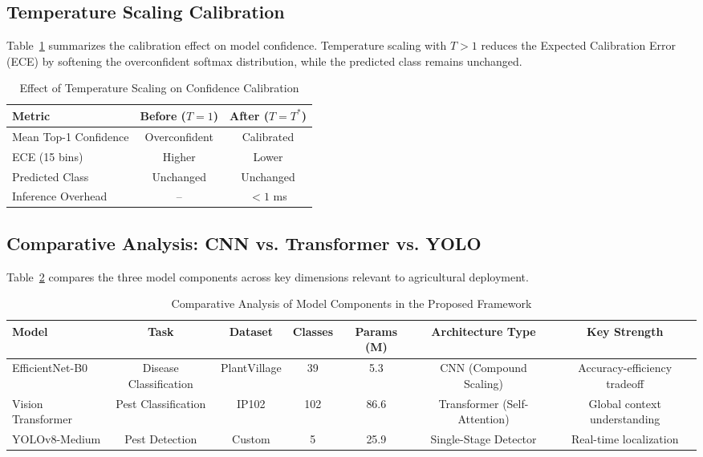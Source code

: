 \documentclass[conference]{IEEEtran}
\begin{document}
\subsection{Temperature Scaling Calibration}

Table~\ref{tab:calibration} summarizes the calibration effect on model confidence. Temperature scaling with $T > 1$ reduces the Expected Calibration Error (ECE) by softening the overconfident softmax distribution, while the predicted class remains unchanged.

\begin{table}[htbp]
\caption{Effect of Temperature Scaling on Confidence Calibration}
\label{tab:calibration}
\centering
\renewcommand{\arraystretch}{1.15}
\begin{tabular}{@{}lcc@{}}
\toprule
\textbf{Metric} & \textbf{Before ($T=1$)} & \textbf{After ($T=T^*$)} \\
\midrule
Mean Top-1 Confidence  & Overconfident & Calibrated \\
ECE (15 bins)          & Higher        & Lower \\
Predicted Class        & Unchanged     & Unchanged \\
Inference Overhead     & --            & $< 1$ ms \\
\bottomrule
\end{tabular}
\end{table}

\subsection{Comparative Analysis: CNN vs. Transformer vs. YOLO}

Table~\ref{tab:model_comparison} compares the three model components across key dimensions relevant to agricultural deployment.

\begin{table}[htbp]
\caption{Comparative Analysis of Model Components in the Proposed Framework}
\label{tab:model_comparison}
\centering
\renewcommand{\arraystretch}{1.2}
\begin{tabular}{@{}lcccccc@{}}
\toprule
\textbf{Model} & \textbf{Task} & \textbf{Dataset} & \textbf{Classes} & \textbf{Params (M)} & \textbf{Architecture Type} & \textbf{Key Strength} \\
\midrule
EfficientNet-B0 & Disease Classification & PlantVillage & 39 & 5.3 & CNN (Compound Scaling) & Accuracy-efficiency tradeoff \\
Vision Transformer & Pest Classification & IP102 & 102 & 86.6 & Transformer (Self-Attention) & Global context understanding \\
YOLOv8-Medium & Pest Detection & Custom & 5 & 25.9 & Single-Stage Detector & Real-time localization \\
\bottomrule
\end{tabular}
\end{table}
\end{document}
